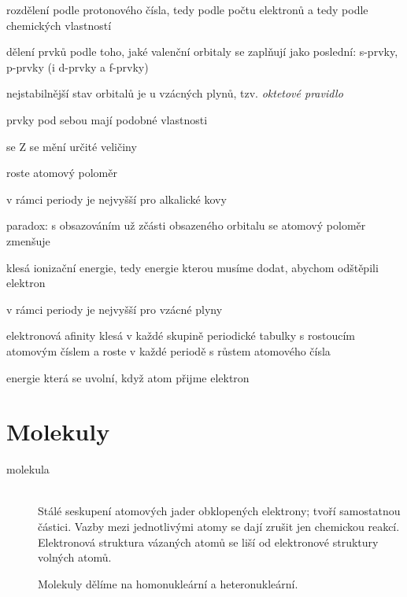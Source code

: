 \documentclass[DIV=8]{scrreprt}
\begin{document}
\begin{myItemize}[nosep]
    \item rozdělení podle protonového čísla, tedy podle počtu elektronů a tedy podle chemických vlastností
    \item dělení prvků podle toho, jaké valenční orbitaly se zaplňují jako poslední: s-prvky, p-prvky (i d-prvky a f-prvky)
    \item nejstabilnější stav orbitalů je u vzácných plynů, tzv. \emph{oktetové pravidlo}
    \item prvky pod sebou mají podobné vlastnosti
    \item se Z se mění určité veličiny
\begin{myItemize}[nosep]
    \item roste atomový poloměr
\begin{myItemize}[nosep]
    \item v rámci periody je nejvyšší pro alkalické kovy
    \item paradox: s obsazováním už zčásti obsazeného orbitalu se atomový poloměr zmenšuje
\end{myItemize}

    \item klesá ionizační energie, tedy energie kterou musíme dodat, abychom odštěpili elektron
\begin{myItemize}[nosep]
    \item v rámci periody je nejvyšší pro vzácné plyny
\end{myItemize}

    \item elektronová afinity klesá v každé skupině periodické tabulky s rostoucím atomovým číslem a roste v každé periodě s růstem atomového čísla
\begin{myItemize}[nosep]
    \item energie která se uvolní, když atom přijme elektron
\end{myItemize}

\end{myItemize}

\end{myItemize}



\section{Molekuly} \label{Molekuly} \FloatBarrier


\begin{description}
\item[molekula]\hfill \\
Stálé seskupení atomových jader obklopených elektrony; tvoří samostatnou částici. Vazby mezi jednotlivými atomy se dají zrušit jen chemickou reakcí. Elektronová struktura vázaných atomů se liší od elektronové struktury volných atomů.

Molekuly dělíme na homonukleární a heteronukleární.

\end{description}
\end{document}
